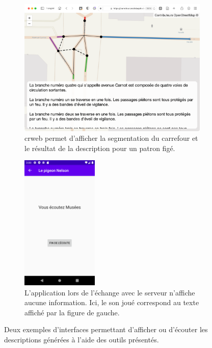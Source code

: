 \begin{figure}[ht]
    \centering
    \begin{subfigure}[t]{.49\linewidth}
        \centering
        \includegraphics[width=\textwidth]{images/experimentation/crweb.png}
        \caption{crweb permet d'afficher la segmentation du carrefour et le résultat de la description pour un patron figé.}
        \label{fig:experimentation_crweb}
    \end{subfigure}
    \hfill
    \begin{subfigure}[t]{.49\linewidth}
        \centering
        \includegraphics[width=0.4\textwidth]{images/experimentation/pigeonnelson.png}
        \caption{L'application lors de l'échange avec le serveur n'affiche aucune information. Ici, le son joué correspond au texte affiché par la figure de gauche.}
        \label{fig:experimentation_pigeonnelson}
    \end{subfigure}
    \caption[Interfaces simplifiées de génération de description]{Deux exemples d'interfaces permettant d'afficher ou d'écouter les descriptions générées à l'aide des outils présentés.}
    \label{fig:experimentation_crweb_pigeon}
\end{figure}

